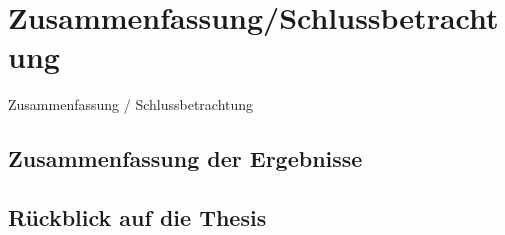 
\section{Zusammenfassung/Schlussbetrachtung}
\label{sec:zusammenfassung-schlussbetrachtung}

Zusammenfassung / Schlussbetrachtung

\subsection{Zusammenfassung der Ergebnisse}

\subsection{Rückblick auf die Thesis}